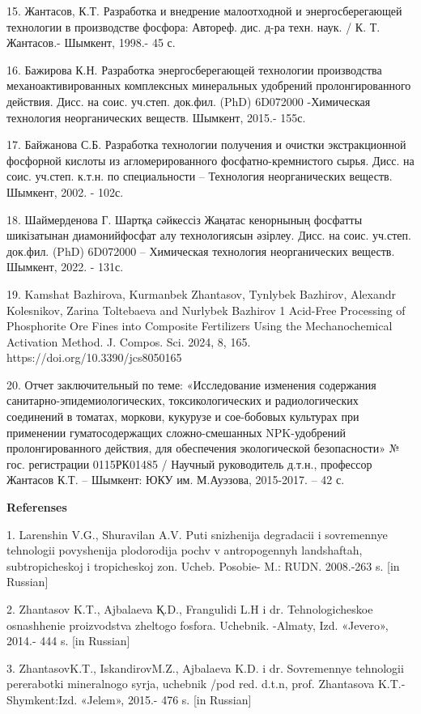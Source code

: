 15. Жантасов, К.Т. Разработка и внедрение малоотходной и
энергосберегающей технологии в производстве фосфора: Автореф. дис. д-ра
техн. наук. / К. Т. Жантасов.- Шымкент, 1998.- 45 с.

16. Бажирова К.Н. Разработка энергосберегающей технологии производства
механоактивированных комплексных минеральных удобрений пролонгированного
действия. Дисс. на соис. уч.степ. док.фил. (PhD) 6D072000 -Химическая
технология неорганических веществ. Шымкент, 2015.- 155с.

17. Байжанова С.Б. Разработка технологии получения и очистки
экстракционной фосфорной кислоты из агломерированного
фосфатно-кремнистого сырья. Дисс. на соис. уч.степ. к.т.н. по
специальности -- Технология неорганических веществ. Шымкент, 2002. -
102с.

18. Шаймерденова Г. Шартқа сәйкессіз Жаңатас кенорнының фосфатты
шикізатынан диамонийфосфат алу технологиясын әзірлеу. Дисс. на соис.
уч.степ. док.фил. (PhD) 6D072000 -- Химическая технология неорганических
веществ. Шымкент, 2022. - 131с.

19. Kamshat Bazhirova, Kurmanbek Zhantasov, Tynlybek Bazhirov, Alexandr
Kolesnikov, Zarina Toltebaeva and Nurlybek Bazhirov 1 Acid-Free
Processing of Phosphorite Ore Fines into Composite Fertilizers Using the
Mechanochemical Activation Method. J. Compos. Sci. 2024, 8, 165.
https://doi.org/10.3390/jcs8050165

20. Отчет заключительный по теме: «Исследование изменения содержания
санитарно-эпидемиологических, токсикологических и радиологических
соединений в томатах, моркови, кукурузе и сое-бобовых культурах при
применении гуматосодержащих сложно-смешанных NPK-удобрений
пролонгированного действия, для обеспечения экологической безопасности»
№ гос. регистрации 0115РК01485 / Научный руководитель д.т.н., профессор
Жантасов К.Т. -- Шымкент: ЮКУ им. М.Ауэзова, 2015-2017. -- 42 с.

{\bfseries Referenses}

1. Larenshin V.G., Shuravilan A.V. Puti snizhenija degradacii i
sovremennye tehnologii povyshenija plodorodija pochv v antropogennyh
landshaftah, subtropicheskoj i tropicheskoj zon. Ucheb. Posobie- M.:
RUDN. 2008.-263 s. {[}in Russian{]}

2. Zhantasov K.T., Ajbalaeva Қ.D., Frangulidi L.H i dr. Tehnologicheskoe
osnashhenie proizvodstva zheltogo fosfora. Uchebnik. -Almaty, Izd.
«Jevero», 2014.- 444 s. {[}in Russian{]}

3. ZhantasovK.T., IskandirovM.Z., Ajbalaeva K.D. i dr. Sovremennye
tehnologii pererabotki mineral\textquotesingle nogo
syr\textquotesingle ja, uchebnik /pod red. d.t.n, prof. Zhantasova
K.T.-Shymkent:Izd. «Jelem», 2015.- 476 s. {[}in Russian{]}

